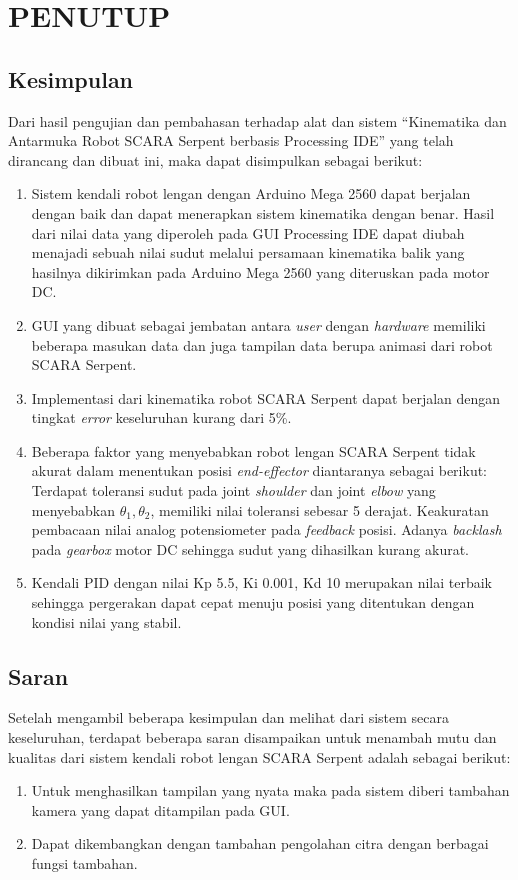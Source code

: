 
\chapter{PENUTUP}
\section{Kesimpulan}
Dari hasil pengujian dan pembahasan terhadap alat dan sistem “Kinematika dan Antarmuka Robot SCARA Serpent berbasis Processing IDE” yang telah dirancang dan dibuat ini, maka dapat disimpulkan sebagai berikut:
\begin{enumerate}
	\item Sistem kendali robot lengan dengan Arduino Mega 2560 dapat berjalan dengan baik dan dapat menerapkan sistem kinematika dengan benar. Hasil dari nilai data yang diperoleh pada GUI Processing IDE dapat diubah menajadi sebuah nilai sudut melalui persamaan kinematika balik yang hasilnya dikirimkan pada Arduino Mega 2560 yang diteruskan pada motor DC.
	\item GUI yang dibuat sebagai jembatan antara \textit{user} dengan \textit{hardware} memiliki beberapa masukan data dan juga tampilan data berupa animasi dari robot SCARA Serpent.
	\item Implementasi dari kinematika robot SCARA Serpent dapat berjalan dengan tingkat \textit{error} keseluruhan kurang dari 5\%. 
	\item  Beberapa faktor yang menyebabkan robot lengan SCARA Serpent tidak akurat dalam menentukan posisi \textit{end-effector} diantaranya sebagai berikut:
	\subitem  Terdapat toleransi sudut pada joint \textit{shoulder} dan joint \textit{elbow} yang menyebabkan $\theta_{1}, \theta_{2}$, memiliki nilai toleransi sebesar 5 derajat. 
	\subitem  Keakuratan  pembacaan nilai analog potensiometer pada \textit{feedback} posisi. 
	\subitem Adanya \textit{backlash} pada \textit{gearbox }motor DC sehingga sudut yang dihasilkan kurang akurat.
	\item  Kendali PID dengan nilai Kp 5.5, Ki 0.001, Kd 10 merupakan nilai terbaik sehingga pergerakan dapat cepat menuju posisi yang ditentukan dengan kondisi nilai yang stabil.
\end{enumerate}

\section{Saran}
Setelah mengambil beberapa kesimpulan dan melihat dari sistem secara keseluruhan, terdapat beberapa saran disampaikan untuk menambah mutu dan kualitas dari sistem kendali robot lengan SCARA Serpent adalah sebagai berikut: 

\begin{enumerate}
	\item Untuk menghasilkan tampilan yang nyata maka pada sistem diberi tambahan kamera yang dapat ditampilan pada GUI.
	\item Dapat dikembangkan dengan tambahan pengolahan citra dengan berbagai fungsi tambahan.
\end{enumerate}